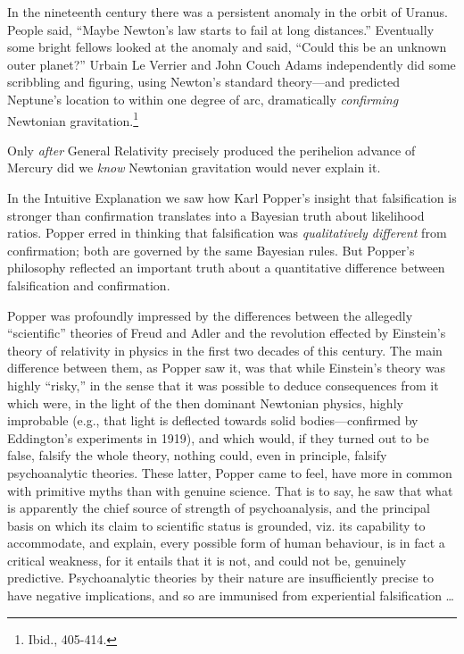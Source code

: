 {
 In the nineteenth century there was a persistent anomaly in the
orbit of Uranus. People said, ``Maybe
Newton's law starts to fail at long
distances.'' Eventually some bright fellows looked at
the anomaly and said, ``Could this be an unknown outer
planet?'' Urbain Le Verrier and John Couch Adams
independently did some scribbling and figuring, using
Newton's standard theory---and predicted
Neptune's location to within one degree of arc,
dramatically \textit{confirming} Newtonian
gravitation.\footnote{Ibid., 405-414.}}

{
 Only \textit{after} General Relativity precisely produced the
perihelion advance of Mercury did we \textit{know} Newtonian
gravitation would never explain it.}

{
 In the Intuitive Explanation we saw how Karl
Popper's insight that falsification is stronger than
confirmation translates into a Bayesian truth about likelihood ratios.
Popper erred in thinking that falsification was \textit{qualitatively
different} from confirmation; both are governed by the same Bayesian
rules. But Popper's philosophy reflected an important
truth about a quantitative difference between falsification and
confirmation.}

{
 Popper was profoundly impressed by the differences between the
allegedly ``scientific'' theories of
Freud and Adler and the revolution effected by
Einstein's theory of relativity in physics in the first
two decades of this century. The main difference between them, as
Popper saw it, was that while Einstein's theory was
highly ``risky,'' in the sense that
it was possible to deduce consequences from it which were, in the light
of the then dominant Newtonian physics, highly improbable (e.g., that
light is deflected towards solid bodies---confirmed by
Eddington's experiments in 1919), and which would, if
they turned out to be false, falsify the whole theory, nothing could,
even in principle, falsify psychoanalytic theories. These latter,
Popper came to feel, have more in common with primitive myths than with
genuine science. That is to say, he saw that what is apparently the
chief source of strength of psychoanalysis, and the principal basis on
which its claim to scientific status is grounded, viz. its capability
to accommodate, and explain, every possible form of human behaviour, is
in fact a critical weakness, for it entails that it is not, and could
not be, genuinely predictive. Psychoanalytic theories by their nature
are insufficiently precise to have negative implications, and so are
immunised from experiential falsification \ldots}

